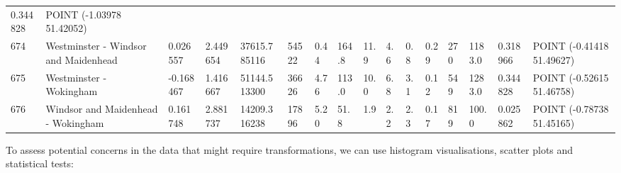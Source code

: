 \documentclass[
  number]{elsarticle}
\begin{document}
\begin{longtable}[]{@{}llllllllllllllll@{}}
0.344828 & POINT (-1.03978 51.42052) \\
674 & Westminster - Windsor and Maidenhead & 0.026557 & 2.449654 &
37615.785116 & 54522 & 0.44 & 164.8 & 11.9 & 4.6 & 0.8 & 0.29 & 270 &
1183.0 & 0.318966 & POINT (-0.41418 51.49627) \\
675 & Westminster - Wokingham & -0.168467 & 1.416667 & 51144.513300 &
36626 & 4.76 & 113.0 & 10.0 & 6.8 & 3.1 & 0.12 & 549 & 1283.0 & 0.344828
& POINT (-0.52615 51.46758) \\
676 & Windsor and Maidenhead - Wokingham & 0.161748 & 2.881737 &
14209.316238 & 17896 & 5.20 & 51.8 & 1.9 & 2.2 & 2.3 & 0.17 & 819 &
100.0 & 0.025862 & POINT (-0.78738 51.45165) \\
\end{longtable}

To assess potential concerns in the data that might require
transformations, we can use histogram visualisations, scatter plots and
statistical tests:
\end{document}

